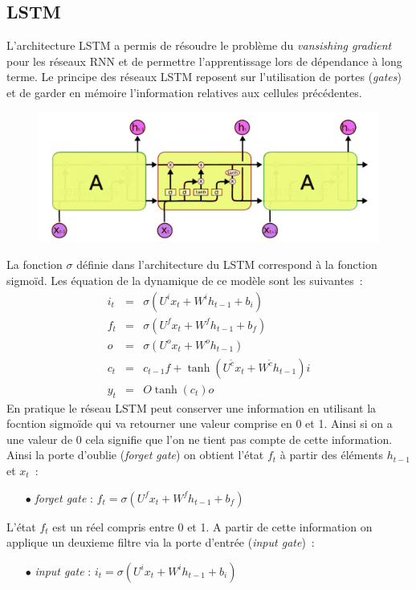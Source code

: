 \documentclass[11pt]{scrartcl} %
\begin{document}
\subsection{LSTM} 
L'architecture LSTM a permis de résoudre le problème du \textit{vansishing gradient} pour les réseaux RNN et de permettre l'apprentissage lors de dépendance à long terme. Le principe des réseaux LSTM reposent sur l'utilisation de portes (\textit{gates}) et de garder en mémoire l'information relatives aux cellules précédentes.  

 \begin{figure}[h]
 \begin{center}
   \includegraphics[scale=.7]{LSTM.png}
\end{center}
\end{figure}


La fonction $\sigma$ définie dans l'architecture du LSTM correspond à la fonction sigmoïd. Les équation de la dynamique de ce modèle sont les suivantes~:
\begin{eqnarray}
i_t&=&\sigma(U^ix_t+W^ih_{t-1}+b_i)\\
f_t&=&\sigma(U^fx_t+W^fh_{t-1}+b_f)\\
o&=&\sigma(U^ox_t+W^oh_{t-1})\\
c_t&=&c_{t-1}f+\tanh\left(U^{\tilde{c}}x_t+W^{\tilde{c}}h_{t-1}\right)i\\
y_t&=&O\tanh\left(c_t\right)o
\end{eqnarray}
En pratique le réseau LSTM peut conserver une information en utilisant la focntion sigmoïde qui va retourner une valeur comprise en 0 et 1. Ainsi si on a une valeur de 0 cela signifie que l'on ne tient pas compte de cette information. Ainsi la porte d'oublie (\textit{forget gate}) on obtient l'état $f_t$ à partir des éléments $h_{t-1}$ et $x_t$~:
\begin{itemize}
\item[$\bullet$] \textit{forget gate} : $f_t = \sigma\left(U^fx_t+W^fh_{t-1}+b_f\right)$
\end{itemize}
L'état $f_t$ est un réel compris entre 0 et 1. A partir de cette information on applique un deuxieme filtre via la porte d'entrée (\textit{input gate})~:
\begin{itemize}
\item[$\bullet$] \textit{input gate} : $i_t = \sigma\left(U^ix_t+W^ih_{t-1}+b_i\right)$
\end{itemize}
\end{document}
